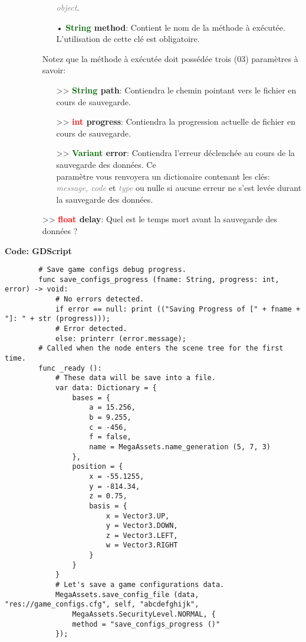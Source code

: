 \documentclass[a4paper, 11pt]{article}
\begin{document}
\begin{description}
\begin{itemize}
\begin{itemize}
			   \textit{\textcolor{gray}{object}}.
			   \item[• \textbf{\textcolor{darkgreen}{String} method}:] Contient le nom de la méthode à
			   exécutée. L'utilisation de cette clé est obligatoire.
			\end{itemize}
			Notez que la méthode à exécutée doit possédée trois (03) paramètres à savoir:
			\begin{itemize}
				\item [>> \textbf{\textcolor{darkgreen}{String} path}:] Contiendra le chemin pointant vers
				le fichier en cours de sauvegarde.
				\item [>> \textbf{\textcolor{red}{int} progress}:] Contiendra la progression actuelle de
				fichier en cours de sauvegarde.
				\item [>> \textbf{\textcolor{darkgreen}{Variant} error}:] Contiendra l'erreur déclenchée au
				cours de la sauvegarde des données. Ce \\paramètre vous renvoyera un dictionaire contenant
				les clés: \textit{\textcolor{gray}{message, code}} et \textit{\textcolor{gray}{type}} ou
				nulle si aucune erreur ne s'est levée durant la sauvegarde des données.
			\end{itemize}
			\item [>> \textbf{\textcolor{red}{float} delay}:] Quel est le temps mort avant la sauvegarde des 
			données ?\\
		\end{itemize}
	\end{description}
	\textbf{Code: GDScript}
	\begin{lstlisting}
		# Save game configs debug progress.
		func save_configs_progress (fname: String, progress: int, error) -> void:
			# No errors detected.
			if error == null: print (("Saving Progress of [" + fname + "]: " + str (progress)));
			# Error detected.
			else: printerr (error.message);
		# Called when the node enters the scene tree for the first time.
		func _ready ():
			# These data will be save into a file.
			var data: Dictionary = {
				bases = {
					a = 15.256,
					b = 9.255,
					c = -456,
					f = false,
					name = MegaAssets.name_generation (5, 7, 3)
				},
				position = {
					x = -55.1255,
					y = -814.34,
					z = 0.75,
					basis = {
						x = Vector3.UP,
						y = Vector3.DOWN,
						z = Vector3.LEFT,
						w = Vector3.RIGHT
					}
				}
			}
			# Let's save a game configurations data.
			MegaAssets.save_config_file (data, "res://game_configs.cfg", self, "abcdefghijk", 		
				MegaAssets.SecurityLevel.NORMAL, {
				method = "save_configs_progress ()"
			});
	\end{lstlisting}
\end{document}
